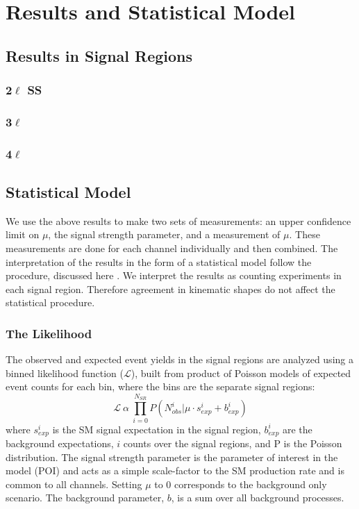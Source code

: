 \chapter[Results and Statistical Model][Results and Statistical Model]{Results and Statistical Model} 
\label{chapter:results} 


\section{Results in Signal Regions}

\subsection{2$\ell$ SS}
\subsection{3$\ell$}
\subsection{4$\ell$}

\section{Statistical Model}


We use the above results to make two sets of measurements: an upper confidence limit on $\mu$, the signal strength parameter, and a measurement of $\mu$. These measurements are done for each channel individually and then combined. 
The interpretation of the results in the form of a statistical model follow the procedure, discussed here \cite{asym}. We interpret the results as counting experiments in each signal region. Therefore agreement in kinematic shapes do not affect the statistical procedure. 


\subsection{The Likelihood} 
The observed and expected event yields in the signal regions are analyzed using a binned likelihood function ($\mathcal{L}$), built from product of Poisson models of expected event counts for each bin, where the bins are the separate signal regions:
\begin{equation}
\mathcal{L}\ \alpha\  \prod_{i=0}^{N_{SR}} P(N_{obs}^{i}| \mu \cdot s_{exp}^{i} + b_{exp}^{i})
\end{equation}
where $s_{exp}^i$ is the SM signal expectation in the signal region, $b_{exp}^i$ are the background expectations, $i$ counts over the signal regions, and P is the Poisson distribution. The signal strength parameter is the parameter of interest in the model (POI) and acts as a simple scale-factor to the SM \tth production rate and is common to all channels. Setting $\mu$ to 0 corresponds to the background only scenario. The background parameter, $b$, is a sum over all background processes. 

